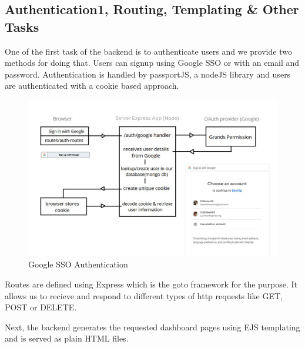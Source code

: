 \documentclass[12pt,a4paper,final]{extreport}
\begin{document}
\subsection{Authentication1, Routing, Templating \& Other Tasks}
One of the first task of the backend is to authenticate users and we provide two methods for doing that. Users can signup using Google SSO or with an email and password. Authentication is handled by passportJS, a nodeJS library and users are authenticated with a cookie based approach.

\begin{figure}[H]
    \centering
    \includegraphics[width=\linewidth]{google-sso-auth.png}
    \caption{Google SSO Authentication}
\end{figure}

Routes are defined using Express which is the goto framework for the purpose. It allows us to recieve and respond to different types of http requests like GET, POST or DELETE. 

Next, the backend generates the requested dashboard pages using EJS templating and is served as plain HTML files.
\end{document}
